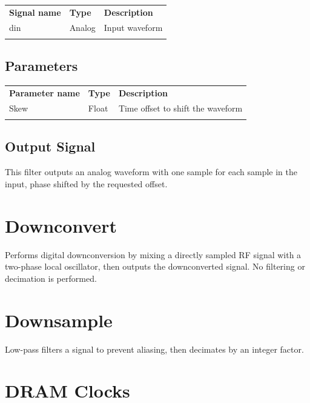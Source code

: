 \begin{tabularx}{16cm}{llX}
\thickhline
\textbf{Signal name} & \textbf{Type} & \textbf{Description} \\
\thickhline
din & Analog & Input waveform \\
\thickhline
\end{tabularx}

\subsection{Parameters}

\begin{tabularx}{16cm}{llX}
\thickhline
\textbf{Parameter name} & \textbf{Type} & \textbf{Description} \\
\thickhline
Skew & Float & Time offset to shift the waveform\\
\thickhline
\end{tabularx}

\subsection{Output Signal}

This filter outputs an analog waveform with one sample for each sample in the input, phase shifted by the requested
offset.

\pagebreak
\section{Downconvert}

Performs digital downconversion by mixing a directly sampled RF signal with a two-phase local oscillator, then outputs
the downconverted signal. No filtering or decimation is performed.

\pagebreak
\section{Downsample}

Low-pass filters a signal to prevent aliasing, then decimates by an integer factor.

\pagebreak
\section{DRAM Clocks}

